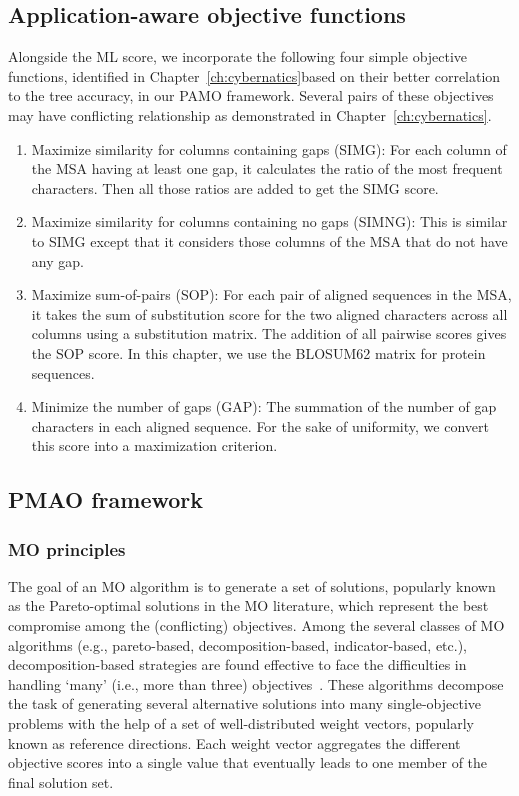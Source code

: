 \subsection{Application-aware objective functions}
Alongside the ML score, we incorporate the following four simple objective functions, identified in Chapter~\ref{ch:cybernatics}based on their better correlation to the tree accuracy, in our PAMO framework. Several pairs of these objectives may have conflicting relationship as demonstrated in Chapter~\ref{ch:cybernatics}.
\begin{enumerate}
	\item Maximize similarity for columns containing gaps (SIMG): For each column of the MSA having at least one gap, it calculates the ratio of the most frequent characters. Then all those ratios are added to get the SIMG score.
	\item Maximize similarity for columns containing no gaps (SIMNG): This is similar to SIMG except that it considers those columns of the MSA that do not have any gap.
	\item Maximize sum-of-pairs (SOP): For each pair of aligned sequences in the MSA, it takes the sum of substitution score for the two aligned characters across all columns using a substitution matrix. The addition of all pairwise scores gives the SOP score. In this chapter, we use the BLOSUM62 matrix for protein sequences.
	\item Minimize the number of gaps (GAP): The summation of the number of gap characters in each aligned sequence. For the sake of uniformity, we convert this score into a maximization criterion.
\end{enumerate}


\subsection{PMAO framework}
\subsubsection{MO principles}
The goal of an MO algorithm is to generate a set of solutions, popularly known as the Pareto-optimal solutions in the MO literature, which represent the best compromise among the (conflicting) objectives.
Among the several classes of MO algorithms (e.g., pareto-based, decomposition-based, indicator-based, etc.), decomposition-based strategies are found effective to face the difficulties in handling `many' (i.e., more than three) objectives~\cite{li2015many}. These algorithms decompose the task of generating several alternative solutions into many single-objective problems with the help of a set of well-distributed weight vectors, popularly known as reference directions. Each weight vector aggregates the different objective scores into a single value that eventually leads to one member of the final solution set.

